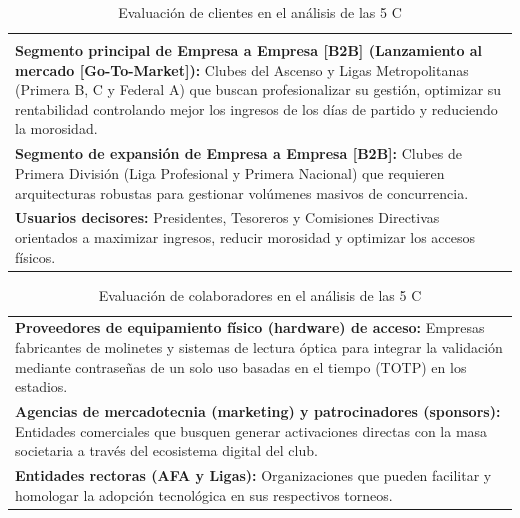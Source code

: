 \begin{table}[h!]
\centering
\renewcommand{\arraystretch}{1.5}
\begin{tabularx}{\textwidth}{|X|}
\hline
\rowcolor{cyan!20} \multicolumn{1}{|c|}{\textbf{CLIENTES}} \\ \hline
\rowcolor{cyan!10} \multicolumn{1}{|c|}{\textbf{Segmentos objetivos}} \\ \hline
\textbf{Segmento principal de Empresa a Empresa [B2B] (Lanzamiento al mercado [Go-To-Market]):} Clubes del Ascenso y Ligas Metropolitanas (Primera B, C y Federal A) que buscan profesionalizar su gestión, optimizar su rentabilidad controlando mejor los ingresos de los días de partido y reduciendo la morosidad. \\
\textbf{Segmento de expansión de Empresa a Empresa [B2B]:} Clubes de Primera División (Liga Profesional y Primera Nacional) que requieren arquitecturas robustas para gestionar volúmenes masivos de concurrencia. \\
\textbf{Usuarios decisores:} Presidentes, Tesoreros y Comisiones Directivas orientados a maximizar ingresos, reducir morosidad y optimizar los accesos físicos. \\ \hline
\end{tabularx}
\caption{Evaluación de clientes en el análisis de las 5 C}
\label{tab:tabla_clientes}
\end{table}

\begin{table}[h!]
\centering
\renewcommand{\arraystretch}{1.5}
\begin{tabularx}{\textwidth}{|X|}
\hline
\rowcolor{green!20} \multicolumn{1}{|c|}{\textbf{COLABORADORES}} \\ \hline
\textbf{Proveedores de equipamiento físico (hardware) de acceso:} Empresas fabricantes de molinetes y sistemas de lectura óptica para integrar la validación mediante contraseñas de un solo uso basadas en el tiempo (TOTP) en los estadios. \\
\textbf{Agencias de mercadotecnia (marketing) y patrocinadores (sponsors):} Entidades comerciales que busquen generar activaciones directas con la masa societaria a través del ecosistema digital del club. \\
\textbf{Entidades rectoras (AFA y Ligas):} Organizaciones que pueden facilitar y homologar la adopción tecnológica en sus respectivos torneos. \\ \hline
\end{tabularx}
\caption{Evaluación de colaboradores en el análisis de las 5 C}
\label{tab:tabla_colaboradores}
\end{table}

